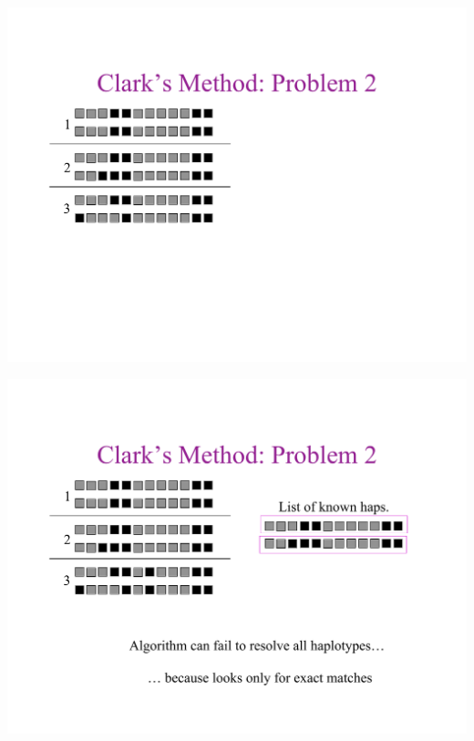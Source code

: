 \newslide{}
\mbox{}
\vspace*{\VertUp}
\enlargethispage*{1000pt}
\begin{center}
\includegraphics*[width=\textwidth]{PPT_pages/pg_0029.pdf}
\end{center}


\newslide{}
\mbox{}
\vspace*{\VertUp}
\enlargethispage*{1000pt}
\begin{center}
\includegraphics*[width=\textwidth]{PPT_pages/pg_0030.pdf}
\end{center}


